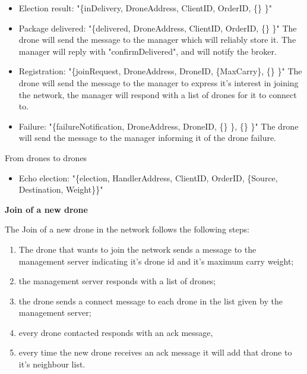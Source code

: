 \documentclass[a4paper, oneside]{memoir}
\begin{document}
\begin{itemize}
	\item Election result: "\{inDelivery, DroneAddress, ClientID, OrderID, \{\} \}"

	\item Package delivered: "\{delivered, DroneAddress, ClientID, OrderID, \{\} \}"
	The drone will send the message to the manager which will reliably store it. The manager will reply with "confirmDelivered", and will notify the broker.

	\item Registration:  "\{joinRequest, DroneAddress, DroneID, \{MaxCarry\}, \{\} \}"
	The drone will send the message to the manager to express it's interest in joining the network, the manager will respond with a list of drones for it to connect to.

	\item Failure:  "\{failureNotification, DroneAddress, DroneID, \{\} \}, \{\} \}"
	The drone will send the message to the manager informing it of the drone failure.
\end{itemize} \vspace{1em}
From drones to drones
\begin{itemize}
	\item Echo election: "\{election, HandlerAddress, ClientID, OrderID, \{Source, Destination, Weight\}\}"
\end{itemize}
\newpage


\textbf{Join of a new drone}

The Join of a new drone in the network follows the following steps:
\begin{enumerate}
\item  The drone that wants to join the network sends a message to the management server indicating it's drone id and it's maximum carry weight;
\item the management server responds with a list of drones;
\item the drone sends a connect message to each drone in the list given by the management server;
\item every drone contacted responds with an ack message,
\item every time the new drone receives an ack message it will add that drone to it's neighbour list.
\end{enumerate}
\end{document}
